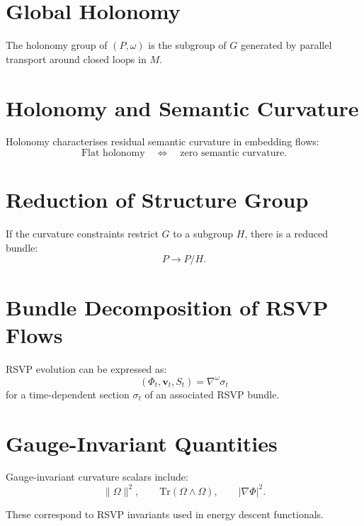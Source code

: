 \section{Global Holonomy}

The holonomy group of $(P,\omega)$ is the subgroup of $G$ generated by parallel transport around closed loops in $M$.

\section{Holonomy and Semantic Curvature}

Holonomy characterises residual semantic curvature in embedding flows:
\[
\text{Flat holonomy} \quad \Longleftrightarrow \quad \text{zero semantic curvature}.
\]

\section{Reduction of Structure Group}

If the curvature constraints restrict $G$ to a subgroup $H$, there is a reduced bundle:
\[
P \to P/H.
\]

\section{Bundle Decomposition of RSVP Flows}

RSVP evolution can be expressed as:
\[
(\Phi_t,\mathbf{v}_t,S_t) = \nabla^\omega \sigma_t
\]
for a time-dependent section $\sigma_t$ of an associated RSVP bundle.

\section{Gauge-Invariant Quantities}

Gauge-invariant curvature scalars include:
\[
\|\Omega\|^2, \qquad \mathrm{Tr}(\Omega\wedge\Omega), \qquad |\nabla\Phi|^2.
\]

These correspond to RSVP invariants used in energy descent functionals.


